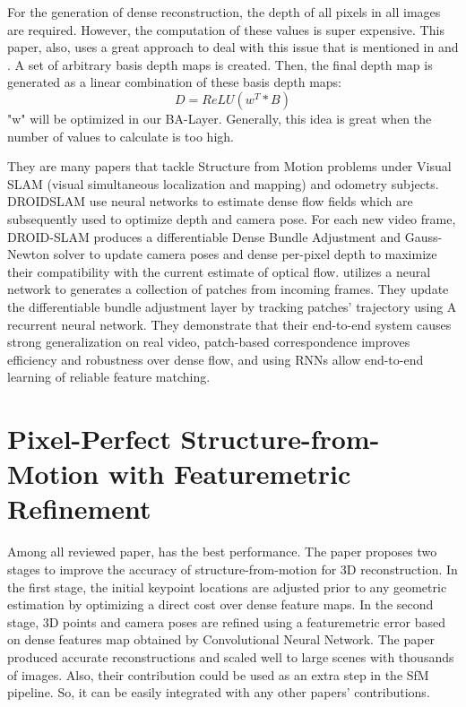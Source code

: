 \documentclass[11pt]{article}
\begin{document}
    For the generation of dense reconstruction, the depth of all pixels in all images are required. However, the
    computation of these values is super expensive. This paper, also, uses a great approach to deal with this
    issue that is mentioned in \cite{tateno2017cnnslam} and \cite{yang2018deep}. A set of arbitrary basis depth maps
    is created. Then, the final depth map is generated as a linear combination of these basis depth maps:
    \[ D = ReLU(w^T * B) \]
    "w" will be optimized in our BA-Layer. Generally, this idea is great when the number of
    values to calculate is too high.

    They are many papers that tackle Structure from Motion problems under Visual SLAM (visual simultaneous
    localization and mapping) and odometry subjects.
    DROIDSLAM \cite{teed2022droidslam} use neural networks to estimate dense flow fields which are subsequently
    used to optimize depth and camera pose. For each new video frame, DROID-SLAM produces a differentiable Dense
    Bundle Adjustment and Gauss-Newton solver to update camera poses and dense per-pixel depth to maximize their
    compatibility with the current estimate of optical flow. \cite{teed2022deep} utilizes a neural network to
    generates a collection of patches from incoming frames. They update the differentiable bundle adjustment layer
    by tracking patches' trajectory using A recurrent neural network. They demonstrate that their end-to-end system
    causes strong generalization on real video, patch-based correspondence improves efficiency and robustness over
    dense flow, and using RNNs allow end-to-end learning of reliable feature matching.

    \newpage
    \section{Pixel-Perfect Structure-from-Motion with Featuremetric Refinement}
    Among all reviewed paper, \cite{lindenberger2021pixsfm} has the best performance. The paper
    proposes two stages to improve the accuracy of structure-from-motion for 3D reconstruction.
    In the first stage, the initial keypoint locations are adjusted prior to any geometric estimation
    by optimizing a direct cost over dense feature maps. In the second stage, 3D points and camera poses
    are refined using a featuremetric error based on dense features map obtained by Convolutional Neural Network.
    The paper produced accurate reconstructions and scaled well to large scenes with thousands of images.
    Also, their contribution could be used as an extra step in the SfM pipeline. So, it can be easily
    integrated with any other papers' contributions.
\end{document}
